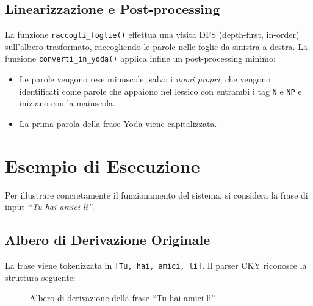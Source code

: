 \documentclass[12pt, a4paper]{article}
\begin{document}
\subsection{Linearizzazione e Post-processing}

La funzione \texttt{raccogli\_foglie()} effettua una visita DFS (depth-first,
in-order) sull'albero trasformato, raccogliendo le parole nelle foglie da sinistra
a destra. La funzione \texttt{converti\_in\_yoda()} applica infine un post-processing
minimo:

\begin{itemize}
    \item Le parole vengono rese minuscole, salvo i \textit{nomi propri}, che
          vengono identificati come parole che appaiono nel lessico con entrambi
          i tag \texttt{N} e \texttt{NP} e iniziano con la maiuscola.
    \item La prima parola della frase Yoda viene capitalizzata.
\end{itemize}


\section{Esempio di Esecuzione}

Per illustrare concretamente il funzionamento del sistema, si considera la frase
di input \textit{``Tu hai amici lì''}.

\subsection{Albero di Derivazione Originale}

La frase viene tokenizzata in \texttt{[Tu, hai, amici, lì]}. Il parser CKY
riconosce la struttura seguente:

\begin{figure}[H]
\centering
{}
\caption{Albero di derivazione della frase ``Tu hai amici lì''}
\end{figure}
\end{document}
